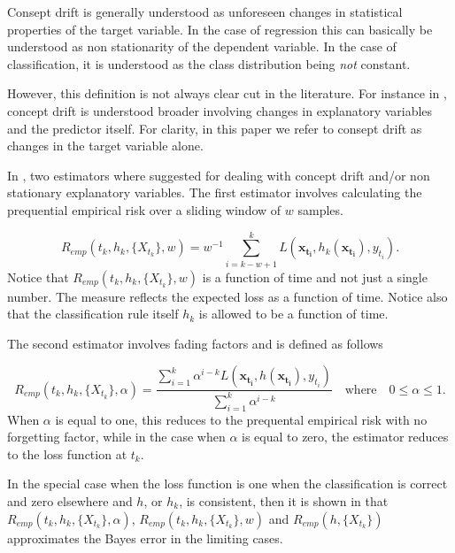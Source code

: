 Consept drift is generally understood as unforeseen changes in statistical properties of the target variable.  In the case of regression this can basically be understood as non stationarity of the dependent variable.  In the case of classification, it is understood as the class distribution being \emph{not} constant.  

However, this definition is not always clear cut in the literature.  For instance in \cite{Brz14}, concept drift is understood broader involving changes in explanatory variables and the predictor itself.    For clarity, in this paper we refer to consept drift as changes in the target variable alone.

In \cite{Gam13}, two estimators where suggested for dealing with concept drift and/or non stationary explanatory variables.  The first estimator involves calculating the prequential empirical risk over a sliding window of $w$ samples. 

\begin{equation}
\label{eq:prequentialRisk2}
R_{emp}(t_k, h_k, \{X_{t_k}\}, w) = w^{-1} \sum_{i=k - w +1}^k L(\bm{x_{t_i}} , h_k(\bm{x_{t_i}} ), y_{t_i}).
\end{equation}
Notice that $R_{emp}(t_k, h_k, \{X_{t_k}\}, w)$ is a function of time and not just a single number.  The measure reflects the expected loss as a function of time.  Notice also that the classification rule itself $h_k$ is allowed to be a function of time.

The second estimator involves fading factors and is defined as follows

\begin{equation}
\label{eq:prequentialRisk3}
R_{emp}(t_k, h_k, \{X_{t_k}\}, \alpha) =\frac{\sum_{i=1}^k \alpha^{i-k}L(\bm{x_{t_i}} , h(\bm{x_{t_i}} ), y_{t_i})}{\sum_{i=1}^k \alpha^{i-k}} \quad \mbox{where} \quad 0 \leq \alpha \leq 1.
\end{equation}
When $\alpha$ is equal to one, this reduces to the prequental empirical risk with no forgetting factor, while in the case when $\alpha$ is equal to zero, the estimator reduces to the loss function at $t_k$.

In the special case when the loss function is one when the classification is correct and zero elsewhere and $h$, or $h_k$, is consistent, then it is shown in \cite{Gam13} that $R_{emp}(t_k, h_k, \{X_{t_k}\}, \alpha)$, $R_{emp}(t_k, h_k, \{X_{t_k}\}, w) $ and $R_{emp}(h, \{X_{t_k}\})$ approximates the Bayes error in the limiting cases.

